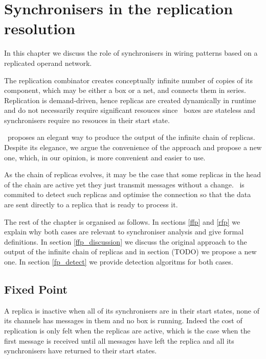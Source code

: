 \chapter{Synchronisers in the replication resolution}

In this chapter we discuss the role of synchronisers in wiring patterns based on a replicated operand network.

The replication combinator creates conceptually infinite number of copies of its component, which may be either a box or a net, and connects them in series. Replication is demand-driven, hence replicas are created dynamically in runtime and do not necessarily require significant resouces since \ak\ boxes are stateless and synchronisers require no resouces in their start state.

\ak\ proposes an elegant way to produce the output of the infinite chain of replicas. Despite its elegance, we argue the convenience of the approach and propose a new one, which, in our opinion, is more convenient and easier to use.

As the chain of replicas evolves, it may be the case that some replicas in the head of the chain are active yet they just transmit messages without a change. \ak\ is commited to detect such replicas and optimise the connection so that the data are sent directly to a replica that is ready to process it. 

The rest of the chapter is organised as follows. In sections \ref{ffp} and \ref{rfp} we explain why both cases are relevant to synchroniser analysis and give formal definitions. In section \ref{ffp_discussion} we discuss the original approach to the output of the infinite chain of replicas and in section (TODO) we propose a new one. In section \ref{fp_detect} we provide detection algoritms for both cases.


    \section{Fixed Point}
A replica is inactive when all of its synchronisers are in their start states, none of its channels has messages in them and no box is running. Indeed the cost of replication is only felt when the replicas are active, which is the case when the first message is received until all messages have left the replica and all its synchronisers have returned to their start states.

